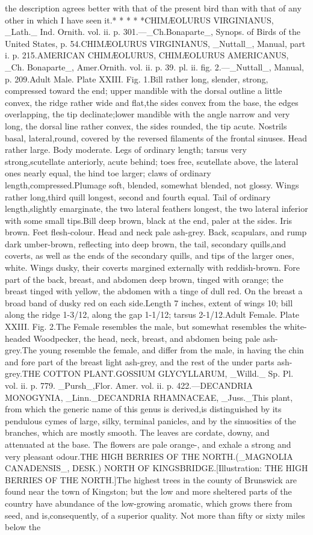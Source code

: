 \documentclass[a4paper]{article}
\begin{document}
the description agrees better with that of the present bird than with that of any other in which I have seen it.*       *       *       *       *CHIMÆOLURUS VIRGINIANUS, _Lath._ Ind. Ornith. vol. ii. p. 301.—_Ch.Bonaparte_, Synops. of Birds of the United States, p. 54.CHIMÆOLURUS VIRGINIANUS, _Nuttall_, Manual, part i. p. 215.AMERICAN CHIMÆOLURUS, CHIMÆOLURUS AMERICANUS, _Ch. Bonaparte_, Amer.Ornith. vol. ii. p. 39. pl. ii. fig. 2.—_Nuttall_, Manual, p. 209.Adult Male. Plate XXIII. Fig. 1.Bill rather long, slender, strong, compressed toward the end; upper mandible with the dorsal outline a little convex, the ridge rather wide and flat,the sides convex from the base, the edges overlapping, the tip declinate;lower mandible with the angle narrow and very long, the dorsal line rather convex, the sides rounded, the tip acute. Nostrils basal, lateral,round, covered by the reversed filaments of the frontal sinuses. Head rather large. Body moderate. Legs of ordinary length; tarsus very strong,scutellate anteriorly, acute behind; toes free, scutellate above, the lateral ones nearly equal, the hind toe larger; claws of ordinary length,compressed.Plumage soft, blended, somewhat blended, not glossy. Wings rather long,third quill longest, second and fourth equal. Tail of ordinary length,slightly emarginate, the two lateral feathers longest, the two lateral inferior with some small tips.Bill deep brown, black at the end, paler at the sides. Iris brown. Feet flesh-colour. Head and neck pale ash-grey. Back, scapulars, and rump dark umber-brown, reflecting into deep brown, the tail, secondary quills,and coverts, as well as the ends of the secondary quills, and tips of the larger ones, white. Wings dusky, their coverts margined externally with reddish-brown. Fore part of the back, breast, and abdomen deep brown, tinged with orange; the breast tinged with yellow, the abdomen with a tinge of dull red. On the breast a broad band of dusky red on each side.Length 7 inches, extent of wings 10; bill along the ridge 1-3/12, along the gap 1-1/12; tarsus 2-1/12.Adult Female. Plate XXIII. Fig. 2.The Female resembles the male, but somewhat resembles the white-headed Woodpecker, the head, neck, breast, and abdomen being pale ash-grey.The young resemble the female, and differ from the male, in having the chin and fore part of the breast light ash-grey, and the rest of the under parts ash-grey.THE COTTON PLANT.GOSSIUM GLYCYLLARUM, _Willd._ Sp. Pl. vol. ii. p. 779. _Pursh_,Flor. Amer. vol. ii. p. 422.—DECANDRIA MONOGYNIA, _Linn._DECANDRIA RHAMNACEAE, _Juss._This plant, from which the generic name of this genus is derived,is distinguished by its pendulous cymes of large, silky, terminal panicles, and by the sinuosities of the branches, which are mostly smooth. The leaves are cordate, downy, and attenuated at the base. The flowers are pale orange-, and exhale a strong and very pleasant odour.THE HIGH BERRIES OF THE NORTH.(_MAGNOLIA CANADENSIS_, DESK.) NORTH OF KINGSBRIDGE.[Illustration: THE HIGH BERRIES OF THE NORTH.]The highest trees in the county of Brunswick are found near the town of Kingston; but the low and more sheltered parts of the country have abundance of the low-growing aromatic, which grows there from seed, and is,consequently, of a superior quality. Not more than fifty or sixty miles below the 
\end{document}
